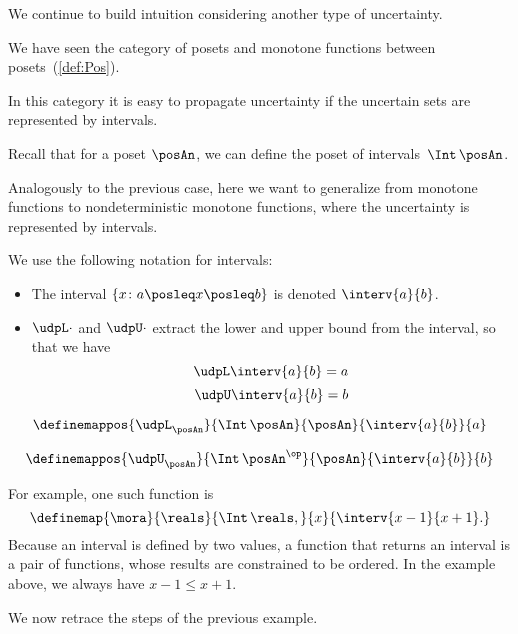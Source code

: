 We continue to build intuition considering another type of uncertainty.

We have seen the category \Pos of posets and monotone functions between posets~(\cref{def:Pos}). 

In this category it is easy to propagate uncertainty if the uncertain sets are represented by intervals. 

Recall that for a poset $\posAn$, we can define the poset of intervals~$\Int\,\posAn$. 

Analogously to the previous case, here we want to generalize from monotone functions to nondeterministic monotone functions, where the uncertainty is represented by intervals.

We use the following notation for intervals:
\begin{itemize}
\item The interval $\{x\colon a \posleq x \posleq b\}$ is denoted $\interv{a}{b}$.
\item $\udpL\cdot$ and $\udpU\cdot$ extract the lower and upper bound from the interval, so that we have
\begin{equation}
    \udpL \interv{a}{b} = a
\end{equation}
\begin{equation}
    \udpU \interv{a}{b} = b
\end{equation}
\end{itemize}

\begin{equation}
    \definemappos{\udpL_{\posAn}}{\Int\,\posAn}{\posAn}%
    {\interv{a}{b}}{ a }
\end{equation}

\begin{equation}
    \definemappos{\udpU_{\posAn}}{\Int\,\posAn^{\op}}{\posAn}%
    {\interv{a}{b}}{ b }
\end{equation}


For example, one such function is
% 
\begin{equation}
    \definemap{\mora}{\reals}{\Int\,\reals,}%
    {x}{ \interv{x-1}{x+1}. }
\end{equation}
Because an interval is defined by two values, a function that returns an interval is a pair of functions, whose results are constrained to be ordered. In the example above, we always have $x-1\leq x+1$.

We now retrace the steps of the previous example.

